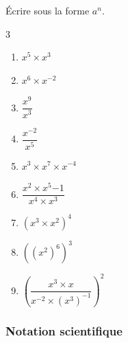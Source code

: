 {\begin{Exercice}
Écrire sous la forme $a^n$.
\vspace{-0.5cm}
\begin{multicols}{3}
\begin{enumerate}[itemsep=1em]
	\item \begin{minipage}[t]{\linewidth}$x^{5}\times x^{3}$\end{minipage}
	\item \begin{minipage}[t]{\linewidth}$x^{6}\times x^{-2}$\end{minipage}
	\item \begin{minipage}[t]{\linewidth}$\dfrac{x^{9}}{x^{3}}$\end{minipage}
	\item \begin{minipage}[t]{\linewidth}$\dfrac{x^{-2}}{x^{5}}$\end{minipage}
	\item \begin{minipage}[t]{\linewidth}$x^3\times x^7\times x^{-4}$\end{minipage}
	\item \begin{minipage}[t]{\linewidth}$\dfrac{x^2\times x^5{-1}}{x^4\times x^3}$\end{minipage}
	\item \begin{minipage}[t]{\linewidth}$(x^3\times x^2)^4$\end{minipage}
	\item \begin{minipage}[t]{\linewidth}$((x^2)^6)^3$\end{minipage}
	\item \begin{minipage}[t]{\linewidth}$\left(\dfrac{x^3\times x}{x^{-2}\times(x^3)^{-1}}\right)^2$\end{minipage}
\end{enumerate}
\end{multicols}
\vspace{-0.5cm}
\end{Exercice}
\newpage

\subsubsection*{Notation scientifique}


}

